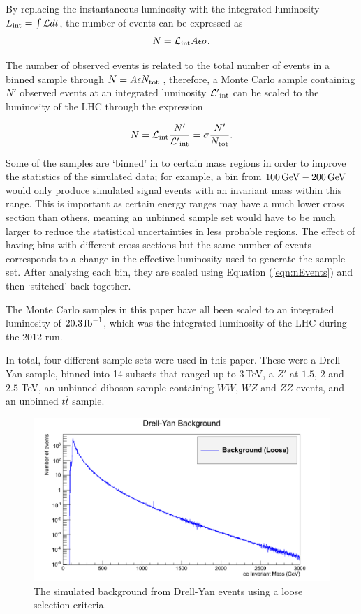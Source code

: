 \documentclass{article}
\begin{document}
By replacing the instantaneous luminosity with the integrated luminosity ${L}_{\rm{int}} = \int \mathcal{L}dt$, the number of events can be expressed as
\begin{equation}
N= \mathcal{L}_{\rm{int}}A\epsilon\sigma.
\end{equation}

The number of observed events is related to the total number of events in a binned sample through $N = A\epsilon N_{\rm{tot}}$ , therefore, a Monte Carlo sample containing $N'$ observed events at an integrated luminosity $\mathcal{L'}_{\rm{int}}$ can be scaled to the luminosity of the LHC through the expression

\begin{equation}
N = \mathcal{L}_{\rm{int}}\frac{N'}{\mathcal{L'}_{\rm{int}}} = \sigma\frac{N'}{N_{\rm{tot}}}.
\label{eqn:nEvents}
\end{equation}

Some of the samples are `binned' in to certain mass regions in order to improve the statistics of the simulated data; for example, a bin from $100\,\rm{GeV}-200\,\rm{GeV}$ would only produce simulated signal events with an invariant mass within this range. This is important as certain energy ranges may have a much lower cross section than others, meaning an unbinned sample set would have to be much larger to reduce the statistical uncertainties in less probable regions. The effect of having bins with different cross sections but the same number of events corresponds to a change in the effective luminosity used to generate the sample set. After analysing each bin, they are scaled using Equation (\ref{eqn:nEvents}) and then `stitched' back together.

The Monte Carlo samples in this paper have all been scaled to an integrated luminosity of $20.3\,\rm{fb}^{-1}$, which was the integrated luminosity of the LHC during the 2012 run.

In total, four different sample sets were used in this paper. These were a Drell-Yan sample, binned into 14 subsets that ranged up to $3\,$TeV, a $Z'$ at $1.5$, $2$ and $2.5$ TeV, an unbinned diboson sample containing $WW$, $WZ$ and $ZZ$ events, and an unbinned $t\overline{t}$ sample.



\begin{figure}[h]
    \centering
    \includegraphics[scale=0.25]{images/DYBackground.png}
    \caption{The simulated background from Drell-Yan events using a loose selection criteria.}
\end{figure}
\end{document}
